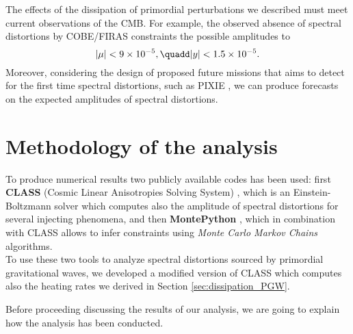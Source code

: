 The effects of the dissipation of primordial perturbations we described must meet current observations of the CMB. For example, the observed absence of spectral distortions by COBE/FIRAS \cite{COBE1996} constraints the possible amplitudes to 
\begin{equation}
    |\mu|<9\times10^{-5},\quadd  |y|<1.5\times 10^{-5}.
\end{equation}
Moreover, considering the design of proposed future missions that aims to detect for the first time spectral distortions, such as PIXIE \cite{pixie}, we can produce forecasts on the expected amplitudes of spectral distortions.
\section{Methodology of the analysis}
To produce numerical results two publicly available codes has been used: first \textbf{CLASS} (Cosmic Linear Anisotropies Solving System) \cite{CLASS}, which is an Einstein-Boltzmann solver which computes also the amplitude of spectral distortions for several injecting phenomena, and then \textbf{MontePython} \cite{Brinckmann:2018cvx,Audren:2012wb}, which in combination with CLASS allows to infer constraints using \emph{Monte Carlo Markov Chains} algorithms.\\
To use these two tools to analyze spectral distortions sourced by primordial gravitational waves, we developed a modified version of CLASS which computes also the heating rates we derived in Section \ref{sec:dissipation_PGW}. 

Before proceeding discussing the results of our analysis, we are going to explain how the analysis has been conducted.
